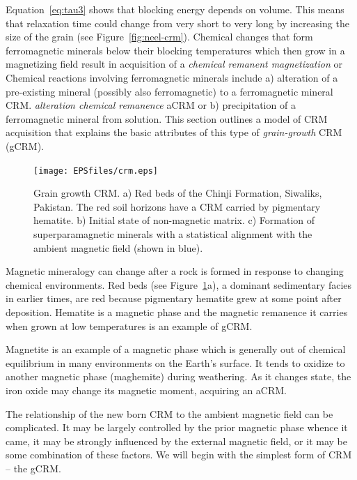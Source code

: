 Equation~\ref{eq:tau3} shows that blocking energy depends on volume.  This means that relaxation time could change from very short to very long by increasing the size of the grain (see Figure~\ref{fig:neel-crm}).    
Chemical changes that form ferromagnetic minerals below their blocking temperatures which then grow  in a magnetizing field result in  acquisition of a {\it chemical remanent magnetization} or 
 Chemical reactions involving  ferromagnetic minerals include a) alteration of a pre-existing mineral (possibly also ferromagnetic) to a ferromagnetic mineral CRM. 
{\it alteration chemical remanence} aCRM or b) precipitation of a ferromagnetic mineral from solution.  This section outlines a model of CRM acquisition that explains the basic attributes of this type of
{\it grain-growth} CRM (gCRM).



\begin{figure}[htb]
\centering  \texttt{[image: EPSfiles/crm.eps]}
\caption{Grain growth CRM. a) Red beds of the Chinji Formation, Siwaliks, Pakistan.  The red soil horizons have a CRM carried by pigmentary hematite.  b) Initial state of non-magnetic matrix.  c) Formation of superparamagnetic minerals with a statistical alignment with the ambient magnetic field (shown in blue). }
\label{fig:chinji}
\end{figure}

Magnetic mineralogy can change after a rock is formed in response to changing chemical environments.   Red beds (see Figure~\ref{fig:chinji}a), a dominant sedimentary facies in earlier times, are red because pigmentary hematite  grew at some point after deposition.  Hematite is a magnetic phase and the magnetic remanence it carries when grown at low temperatures is an example of gCRM.    

Magnetite is an example of a magnetic phase which is generally out of chemical equilibrium in many environments on the Earth's surface.  It tends to oxidize to another magnetic phase (maghemite) during weathering.  As it changes state, the iron oxide may change its magnetic moment, acquiring an 
aCRM.  

The relationship of the new born CRM to the ambient magnetic field can be complicated.  It may be largely controlled by the prior magnetic phase whence it came, it may be strongly influenced by the external magnetic field, or it may be some combination of these factors.  We will begin with the simplest form of CRM -- the gCRM.  

